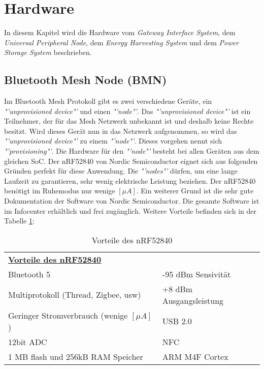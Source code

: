 \clearpage
\section{Hardware}\label{sec:Hardware}
In diesem Kapitel wird die Hardware vom \textit{Gateway Interface System}, dem \textit{Universal Peripheral Node}, dem \textit{Energy Harvesting System} und dem \textit{Power Storage System} beschrieben. 


\subsection{Bluetooth Mesh Node (BMN)}\label{subsec:BMN}
Im Bluetooth Mesh Protokoll gibt es zwei verschiedene  Geräte, ein \textit{"'unprovisioned device"'} und einen \textit{"'node"'}. Das \textit{"'unprovisioned device"'}  ist ein Teilnehmer, der für das Mesh Netzwerk unbekannt ist und deshalb keine Rechte besitzt. Wird dieses Gerät nun in das Netzwerk aufgenommen, so wird das \textit{"'unprovisioned device"'}  zu einem \textit{"'node"'}. Dieses vorgehen nennt sich \textit{"'provisioning"'}.\cite{afaneh_ultimate_2018} Die Hardware für den \textit{"'node"'} besteht bei allen Geräten aus dem gleichen SoC. Der nRF52840 von Nordic Semiconductor eignet sich aus folgenden Gründen perfekt für diese Anwendung. Die \textit{"'nodes"'} dürfen, um eine lange Laufzeit zu garantieren, sehr wenig elektrische Leistung beziehen. Der nRF52840 benötigt im Ruhemodus nur wenige $[\mu A]$. Ein weiterer Grund ist die sehr gute Dokumentation der Software von Nordic Semiconductor. Die gesamte Software ist im Infocenter erhältlich und frei zugänglich. Weitere Vorteile befinden sich in der Tabelle \ref{tbl:Vorteilte_nRF52}:\cite{nordic_semiconductor_nrf52840_2019} \\

\begin{table}[h]
	\begin{tabular}{ll}
		\multicolumn{2}{l}{{\ul \textbf{Vorteile des nRF52840}}}       \\
		Bluetooth 5                          											   & -95 dBm Sensivität      \\
		Multiprotokoll (Thread, Zigbee, usw) 						   & +8 dBm Ausgangsleistung \\
		Geringer Stromverbrauch  (wenige $[\mu A]$)      	& USB 2.0                 \\
		12bit ADC                            												& NFC                     \\
		1 MB flash und 256kB RAM Speicher    						& ARM M4F Cortex         
	\end{tabular}
	\caption{Vorteile des nRF52840}
	\label{tbl:Vorteilte_nRF52}
\end{table}


